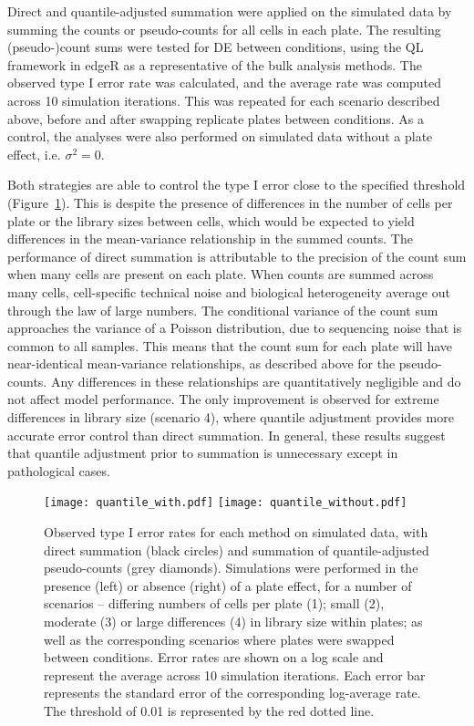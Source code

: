 \documentclass{article}
\begin{document}
Direct and quantile-adjusted summation were applied on the simulated data by summing the counts or pseudo-counts for all cells in each plate.
The resulting (pseudo-)count sums were tested for DE between conditions, using the QL framework in edgeR as a representative of the bulk analysis methods.
The observed type I error rate was calculated, and the average rate was computed across 10 simulation iterations.
This was repeated for each scenario described above, before and after swapping replicate plates between conditions.
As a control, the analyses were also performed on simulated data without a plate effect, i.e. $\sigma^2=0$.

Both strategies are able to control the type I error close to the specified threshold (Figure~\ref{fig:complexplate}).
This is despite the presence of differences in the number of cells per plate or the library sizes between cells,
    which would be expected to yield differences in the mean-variance relationship in the summed counts.
The performance of direct summation is attributable to the precision of the count sum when many cells are present on each plate.
When counts are summed across many cells, cell-specific technical noise and biological heterogeneity average out through the law of large numbers.
The conditional variance of the count sum approaches the variance of a Poisson distribution, due to sequencing noise \cite{marioni2008rnaseq} that is common to all samples.
This means that the count sum for each plate will have near-identical mean-variance relationships, as described above for the pseudo-counts.
Any differences in these relationships are quantitatively negligible and do not affect model performance.
The only improvement is observed for extreme differences in library size (scenario 4), where quantile adjustment provides more accurate error control than direct summation.
In general, these results suggest that quantile adjustment prior to summation is unnecessary except in pathological cases.

\begin{figure}[tbp]
\begin{center}
\texttt{[image: quantile\_with.pdf]}
\texttt{[image: quantile\_without.pdf]}
\end{center}
\caption{
    Observed type I error rates for each method on simulated data, with direct summation (black circles) and summation of quantile-adjusted pseudo-counts (grey diamonds). 
    Simulations were performed in the presence (left) or absence (right) of a plate effect, for a number of scenarios
        -- differing numbers of cells per plate (1);
        small (2), moderate (3) or large differences (4) in library size within plates;
        as well as the corresponding scenarios where plates were swapped between conditions.
    Error rates are shown on a log scale and represent the average across 10 simulation iterations.
    Each error bar represents the standard error of the corresponding log-average rate.
    The threshold of 0.01 is represented by the red dotted line.
}
\label{fig:complexplate}
\end{figure}
\end{document}
